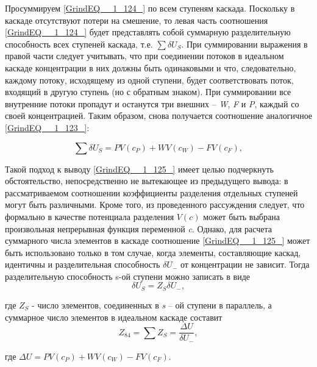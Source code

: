 Просуммируем \ref{GrindEQ__1_124_} по всем ступеням каскада. Поскольку в каскаде отсутствуют потери на смешение, то левая часть соотношения \ref{GrindEQ__1_124_} будет представлять собой суммарную разделительную способность всех ступеней каскада, т.е. $\sum \delta U_{S}  $. При суммировании выражения в правой части следует учитывать, что при соединении потоков в идеальном каскаде концентрации в них должны быть одинаковыми и что, следовательно, каждому потоку, исходящему из одной ступени, будет соответствовать поток, входящий в другую ступень (но с обратным знаком). При суммировании все внутренние потоки пропадут и останутся три внешних -- \textit{W}, \textit{F} и \textit{P}, каждый со своей концентрацией. Таким образом, снова получается соотношение аналогичное \ref{GrindEQ__1_123_}:

\begin{equation} \label{GrindEQ__1_125_} 
\sum \delta U_{S} =PV(c_{P} )+WV(c_{W} )-FV(c_{F} ) ,                             
\end{equation} 

Такой подход к выводу \ref{GrindEQ__1_125_} имеет целью подчеркнуть обстоятельство, непосредственно не вытекающее из предыдущего вывода: в рассматриваемом соотношении коэффициенты разделения отдельных ступеней могут быть различными. Кроме того, из проведенного рассуждения следует, что формально в качестве потенциала разделения $V(c)$ может быть выбрана произвольная непрерывная функция переменной \textit{c}. Однако, для расчета суммарного числа элементов в каскаде соотношение \ref{GrindEQ__1_125_} может быть использовано только в том случае, когда элементы, составляющие каскад, идентичны и разделительная способность $\delta U_{-} $ от концентрации не зависит. Тогда разделительную способность s-ой ступени можно записать в виде
\begin{equation} \label{GrindEQ__1_126_} 
\delta U_{{S}} =Z_{S} \delta U_{-} ,                                       
\end{equation} 

где $Z_{S} $ - число элементов, соединенных в \textit{s} -- ой ступени в параллель, а суммарное число элементов в идеальном каскаде составит
\begin{equation} \label{GrindEQ__1_127_} 
Z_{84} =\sum Z_{S} =\frac{\Delta U}{\delta U_{-} }  ,                                
\end{equation} 

где  $\Delta U=PV(c_{P} )+WV(c_{W} )-FV(c_{F} )$.\label{GrindEQ__1_128_}

